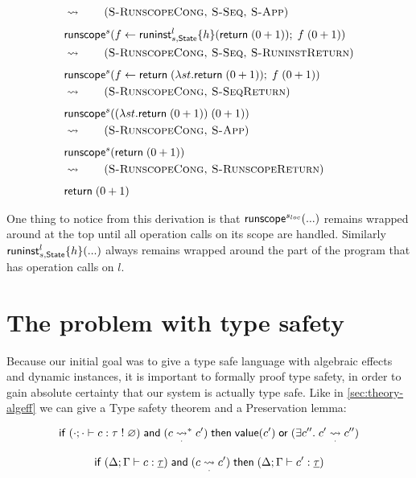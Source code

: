 {\begin{align*}
& \opsem{} \tag{\textsc{S-RunscopeCong, S-Seq, S-App}} \\
& \chandlec{s}{\cdo{f}{\chandlei{l}{s,\mathsf{State}}{h}{\creturn{(0 + 1)}}}{\capp{f}{(0 + 1)}}} \\
& \opsem{} \tag{\textsc{S-RunscopeCong, S-Seq, S-RuninstReturn}} \\
& \chandlec{s}{\cdo{f}{\creturn (\vabs{st}{\creturn{(0 + 1)}})}{\capp{f}{(0 + 1)}}} \\
& \opsem{} \tag{\textsc{S-RunscopeCong, S-SeqReturn}} \\
& \chandlec{s}{\capp{(\vabs{st}{\creturn{(0 + 1)}})}{(0 + 1)}} \\
& \opsem{} \tag{\textsc{S-RunscopeCong, S-App}} \\
& \chandlec{s}{\creturn{(0 + 1)}} \\
& \opsem{} \tag{\textsc{S-RunscopeCong, S-RunscopeReturn}} \\
& \creturn{(0 + 1)}
\end{align*}

One thing to notice from this derivation is that $\mathsf{runscope}^{s_{loc}} ( ... )$ remains wrapped around at the top until all operation calls on its scope are handled. Similarly $\mathsf{runinst}^{l}_{s,\mathsf{State}} \{ h \} ( ... )$ always remains wrapped around the part of the program that has operation calls on $l$.

\section{The problem with type safety}
\label{sec:typesafety}

Because our initial goal was to give a type safe language with algebraic effects and dynamic instances, it is important to formally proof type safety, in order to gain absolute certainty that our system is actually type safe. 
Like in \cref{sec:theory-algeff} we can give a Type safety theorem and a Preservation lemma:

\begin{theorem}
\[
	\mathsf{if}\;
		(\cdot;\cdot \vdash c : \tau \; ! \; \varnothing)
		\;\mathsf{and}\;
		(c \underset{\cdot}{\rightsquigarrow}^* c')
	\;\mathsf{then}\;
		\mathsf{value}(c')
		\;\mathsf{or}\;
		(\exists c''.\; c' \underset{\cdot}{\rightsquigarrow} c'')
\]
\end{theorem}

\begin{lemma}[Preservation]
\[
	\mathsf{if}\;
		(\Delta;\Gamma \vdash c : \underline{\tau})
		\;\mathsf{and}\;
		(c \underset{\cdot}{\rightsquigarrow} c')
	\;\mathsf{then}\;
		(\Delta;\Gamma \vdash c' : \underline{\tau})
\]
\end{lemma}

}
